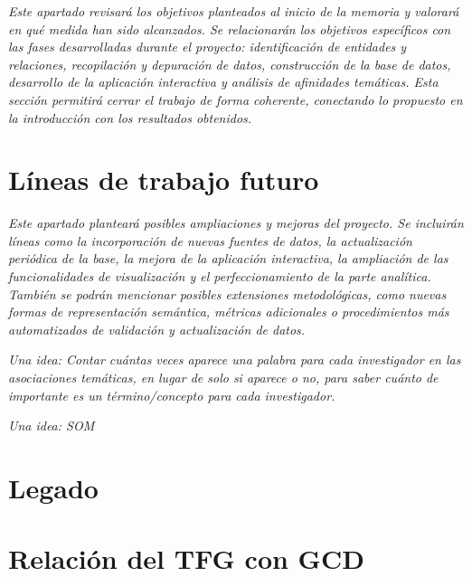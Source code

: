 \documentclass[11pt,spanish,listoffigures,listoftables]{tfgetsinf}
\begin{document}
\textit{Este apartado revisará los objetivos planteados al inicio de la memoria y valorará en qué medida han sido alcanzados. Se relacionarán los objetivos específicos con las fases desarrolladas durante el proyecto: identificación de entidades y relaciones, recopilación y depuración de datos, construcción de la base de datos, desarrollo de la aplicación interactiva y análisis de afinidades temáticas. Esta sección permitirá cerrar el trabajo de forma coherente, conectando lo propuesto en la introducción con los resultados obtenidos.}

\section{Líneas de trabajo futuro}

\textit{Este apartado planteará posibles ampliaciones y mejoras del proyecto. Se incluirán líneas como la incorporación de nuevas fuentes de datos, la actualización periódica de la base, la mejora de la aplicación interactiva, la ampliación de las funcionalidades de visualización y el perfeccionamiento de la parte analítica. También se podrán mencionar posibles extensiones metodológicas, como nuevas formas de representación semántica, métricas adicionales o procedimientos más automatizados de validación y actualización de datos.}

\textit{Una idea: Contar cuántas veces aparece una palabra para cada investigador en las asociaciones temáticas, en lugar de solo si aparece o no, para saber cuánto de importante es un término/concepto para cada investigador.}

\textit{Una idea: SOM}

\section{Legado}

\section{Relación del TFG con GCD}

\end{document}
